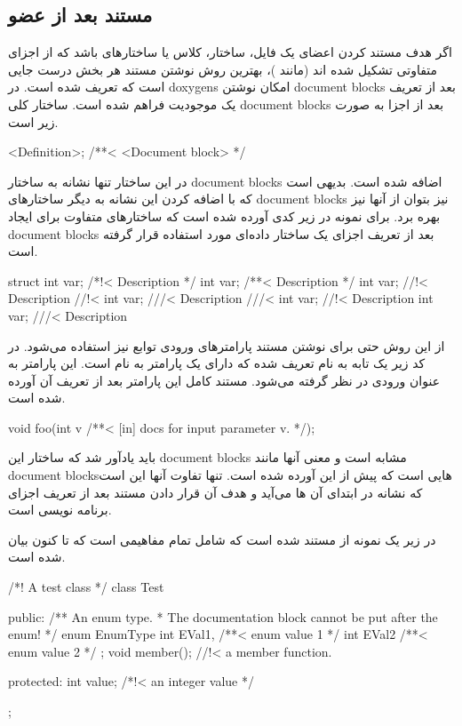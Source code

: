 \subsection{مستند بعد از عضو}

اگر هدف مستند کردن اعضای یک فایل، ساختار، کلاس یا ساختارهای باشد که از اجزای
متفاوتی تشکیل شده اند (مانند )، بهترین روش نوشتن  مستند هر بخش درست
جایی است که تعریف شده است. در \glspl{doxygen} امکان نوشتن \glspl{document block}
بعد از تعریف یک موجودیت فراهم شده است. ساختار کلی \glspl{document block} بعد از
اجزا به صورت زیر است.

\begin{C++}
<Definition>; /**< <Document block> */
\end{C++}

در این ساختار تنها نشانه \lr{<} به ساختار \glspl{document block} اضافه شده است.
بدیهی است که با اضافه کردن این نشانه به دیگر ساختارهای \glspl{document block}
نیز بتوان از آنها نیز بهره برد. برای نمونه در زیر کدی آورده شده است که ساختارهای
متفاوت برای ایجاد \glspl{document block} بعد از تعریف اجزای یک ساختار داده‌ای
مورد استفاده قرار گرفته است.

\begin{C++}
struct {
	int var; /*!< Description */
	int var; /**< Description */
	int var; //!< Description
	         //!< 
	int var; ///< Description
	         ///<
	int var; //!< Description
	int var; ///< Description
}
\end{C++}

از این روش حتی برای نوشتن مستند پارامترهای ورودی توابع نیز استفاده می‌شود. در کد
زیر یک تابه به نام  تعریف شده که دارای یک پارامتر به نام  است. این
پارامتر به عنوان ورودی در نظر گرفته می‌شود. مستند کامل این پارامتر بعد از تعریف
آن آورده شده است.

\begin{C++}
void foo(int v /**< [in] docs for input parameter v. */);
\end{C++}

باید یادآور شد که ساختار این \glspl{document block} مشابه است و معنی آنها مانند
\glspl{document block}هایی است که پیش از این آورده شده است. تنها
تفاوت آنها این است که نشانه \lr{<} در ابتدای آن ها می‌آید و هدف آن قرار دادن
مستند بعد از تعریف اجزای برنامه نویسی است.

در زیر یک نمونه از مستند شده است که شامل تمام مفاهیمی است که تا کنون بیان شده
است.

\begin{C++}
/*! A test class */
class Test
{
  public:
    /** An enum type. 
     *  The documentation block cannot be put after the enum! 
     */
    enum EnumType
    {
      int EVal1,     /**< enum value 1 */
      int EVal2      /**< enum value 2 */
    };
    void member();   //!< a member function.
    
  protected:
    int value;       /*!< an integer value */
};
\end{C++}

